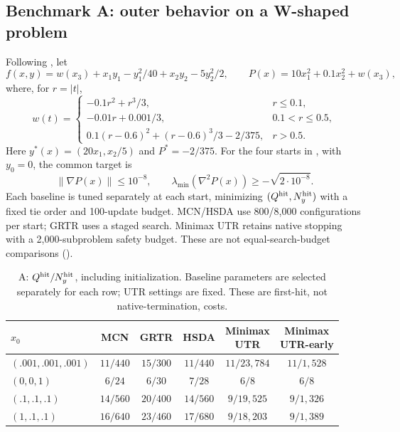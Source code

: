 \subsection{Benchmark A: outer behavior on a W-shaped problem}
\label{sec:w-shaped}

Following \citet{luo2022finding}, let
\[
 f(x,y)=w(x_3)+x_1y_1-y_1^2/40+x_2y_2-5y_2^2/2,
 \qquad P(x)=10x_1^2+0.1x_2^2+w(x_3),
\]
where, for $r=|t|$,
\[
 w(t)=\begin{cases}
 -0.1r^2+r^3/3,&r\le0.1,\\
 -0.01r+0.001/3,&0.1<r\le0.5,\\
 0.1(r-0.6)^2+(r-0.6)^3/3-2/375,&r>0.5.
 \end{cases}
\]
Here $y^*(x)=(20x_1,x_2/5)$ and $P^*=-2/375$. For the four starts
in , with $y_0=0$, the common target is
\begin{equation}
 \|\nabla P(x)\|\le10^{-8},\qquad
 \lambda_{\min}(\nabla^2P(x))\ge-\sqrt{2\cdot10^{-8}}.
 \label{eq:wshape-target}
\end{equation}
Each baseline is tuned separately at each start, minimizing
$(Q^{\rm hit},N_y^{\rm hit})$ with a fixed tie order and 100-update
budget. MCN/HSDA use 800/8,000 configurations per start; GRTR uses a
staged search. Minimax UTR retains native stopping with a 2,000-subproblem
safety budget. These are not equal-search-budget comparisons
().

\begin{table}[tb]
\centering\small
\setlength{\tabcolsep}{4pt}
\begin{tabular}{lccccc}
\toprule
$x_0$ & MCN & GRTR & HSDA & \shortstack{Minimax\\UTR} & \shortstack{Minimax\\UTR-early}\\
\midrule
$(.001,.001,.001)$ & $11/440$ & $15/300$ & $11/440$ & $11/23{,}784$ & $11/1{,}528$\\
$(0,0,1)$ & $6/24$ & $6/30$ & $7/28$ & $6/8$ & $6/8$\\
$(.1,.1,.1)$ & $14/560$ & $20/400$ & $14/560$ & $9/19{,}525$ & $9/1{,}326$\\
$(1,.1,.1)$ & $16/640$ & $23/460$ & $17/680$ & $9/18{,}203$ & $9/1{,}389$\\
\bottomrule
\end{tabular}
\caption{A: $Q^{\rm hit}/N_y^{\rm hit}$, including initialization.
Baseline parameters are selected separately for each row; UTR settings
are fixed. These are first-hit, not native-termination, costs.}
\label{tab:exp-a-hits}
\end{table}

